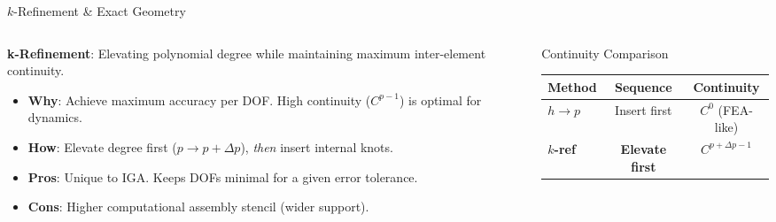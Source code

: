 \begin{frame}{$k$-Refinement \& Exact Geometry}
  \begin{columns}[T]
    \begin{column}{0.52\textwidth}
      \small
      \textbf{k-Refinement}: Elevating polynomial degree while maintaining maximum inter-element continuity.
      \par\vspace{0.15cm}
      \begin{itemize}
        \item \textbf{Why}: Achieve maximum accuracy per DOF. High continuity ($C^{p-1}$) is optimal for dynamics.
        \item \textbf{How}: Elevate degree first ($p \to p+\Delta p$), \textit{then} insert internal knots.
        \item \textbf{Pros}: Unique to IGA. Keeps DOFs minimal for a given error tolerance.
        \item \textbf{Cons}: Higher computational assembly stencil (wider support).
      \end{itemize}
      \par\vspace{0.2cm}
      \centering
      \href{https://cnam-internship-mumen.netlify.app/app/simulations/iga-sim-1.5/}{}
    \end{column}
    \begin{column}{0.45\textwidth}
      \begin{alertblock}{Continuity Comparison}
        \centering\scriptsize
        \begin{tabular}{lcc}
          \toprule
          \textbf{Method}  & \textbf{Sequence}      & \textbf{Continuity}           \\
          \midrule
          $h \to p$        & Insert first           & $C^0$ (FEA-like)              \\
          \textbf{$k$-ref} & \textbf{Elevate first} & \textbf{$C^{p+\Delta p - 1}$} \\
          \bottomrule
        \end{tabular}
      \end{alertblock}
      \vspace{0.05cm}
      \centering
      \scalebox{0.68}{
        \begin{tikzpicture}[scale=1.2, >=stealth]
          \begin{scope}[xshift=0cm]

\end{scope}
\end{tikzpicture}}
\end{column}
\end{columns}
\end{frame}
